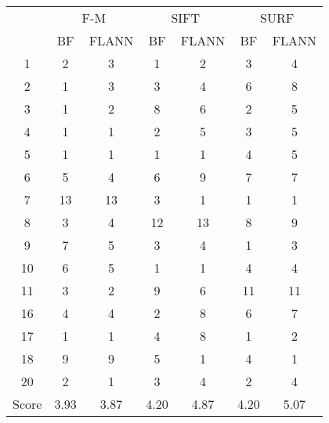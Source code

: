 \documentclass[draft,final]{vutinfth} %
\begin{document}
\begin{appendices}
\begin{minipage}{\linewidth}
\centering
\begin{tabular}{c|cc|cc|cc}
\multirow{2}{*}{ } & \multicolumn{2}{c}{ F-M } & \multicolumn{2}{c}{ SIFT } & \multicolumn{2}{c}{ SURF } \\
& BF & FLANN & BF & FLANN & BF & FLANN \\
\hline
1 & 2 & 3 & 1 & 2 & 3 & 4 \\
2 & 1 & 3 & 3 & 4 & 6 & 8 \\
3 & 1 & 2 & 8 & 6 & 2 & 5 \\
4 & 1 & 1 & 2 & 5 & 3 & 5 \\
5 & 1 & 1 & 1 & 1 & 4 & 5 \\
6 & 5 & 4 & 6 & 9 & 7 & 7 \\
7 & 13 & 13 & 3 & 1 & 1 & 1 \\
8 & 3 & 4 & 12 & 13 & 8 & 9 \\
9 & 7 & 5 & 3 & 4 & 1 & 3 \\
10 & 6 & 5 & 1 & 1 & 4 & 4 \\
11 & 3 & 2 & 9 & 6 & 11 & 11 \\
16 & 4 & 4 & 2 & 8 & 6 & 7 \\
17 & 1 & 1 & 4 & 8 & 1 & 2 \\
18 & 9 & 9 & 5 & 1 & 4 & 1 \\
20 & 2 & 1 & 3 & 4 & 2 & 4 \\
\hline
Score & 3.93 & 3.87 & 4.20 & 4.87 & 4.20 & 5.07 \\
\end{tabular}
 \label{tab:25Cent} 
\end{minipage}


\end{appendices}
\end{document}
